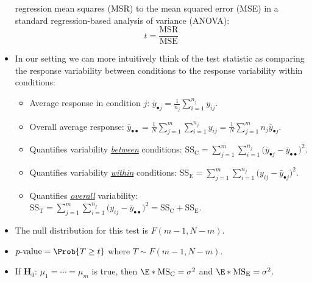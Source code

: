 \begin{itemize}
            regression mean squares (MSR)
            to the mean squared error (MSE) in a standard regression-based analysis of variance (ANOVA):
            \[ t=\frac{\text{MSR}}{\text{MSE}} \]
      \item In our setting we can more intuitively think of the test
            statistic as comparing the response variability
            between conditions to the response variability within conditions:
            \begin{itemize}
                  \item Average response in condition $ j $: $ \displaystyle \bar{y}_{\bullet j}=\frac{1}{n_j} \sum_{i=1}^{n_j} y_{ij} $.
                  \item Overall average response: $ \displaystyle \bar{y}_{\bullet\bullet}=\frac{1}{N} \sum_{j=1}^{m} \sum_{i=1}^{n_j} y_{ij}=\frac{1}{N} \sum_{j=1}^{m} n_j\bar{y}_{\bullet j} $.
                  \item Quantifies variability \underline{\emph{between}} conditions:
                        $ \displaystyle \text{SS}_\text{C}=\sum_{j=1}^{m} \sum_{i=1}^{n_j} \bigl(\bar{y}_{\bullet j}-\bar{y}_{\bullet\bullet}\bigr)^2 $.
                  \item Quantifies variability \underline{\emph{within}} conditions:
                        $ \displaystyle \text{SS}_\text{E}=\sum_{j=1}^{m} \sum_{i=1}^{n_j} \bigl(y_{ij}-\bar{y}_{\bullet j}\bigr)^2 $.
                  \item Quantifies \underline{\emph{overall}} variability:
                        $ \displaystyle \text{SS}_\text{T}=\sum_{j=1}^{m} \sum_{i=1}^{n_j} \bigl(y_{ij}-\bar{y}_{\bullet\bullet}\bigr)^2=\text{SS}_\text{C}+\text{SS}_\text{E} $.
            \end{itemize}
      \item The null distribution for this test is $ F(m-1,N-m) $.
      \item $ p\text{-value}=\Prob{T\ge t} $ where $ T \sim F(m-1,N-m) $.
      \item If $ \mathbf{H}_0 $: $ \mu_1=\cdots=\mu_m $ is true, then $ \E*{\text{MS}_\text{C}}=\sigma^2 $ and $ \E*{\text{MS}_\text{E}}=\sigma^2 $.
\end{itemize}
